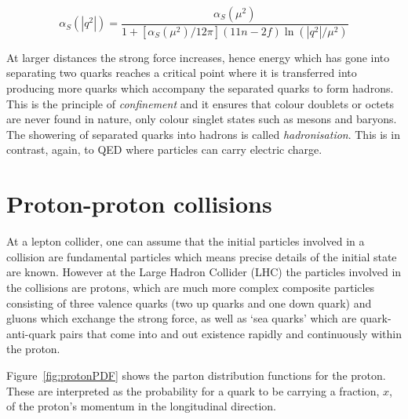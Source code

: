 \begin{equation}
\label{eqn:alphaSQCD}
\alpha_{S}\left( |q^{2}| \right) = \frac{\alpha_{S}\left( \mu^{2} \right)} {1 + \left[ \alpha_{S}\left( \mu^{2} \right)/12\pi \right]\left( 11n -2f \right) \ln \left(|q^{2}|/\mu^{2}\right)}
\end{equation}

At larger distances the strong force increases, hence energy which has gone into separating two quarks reaches a critical point where it is transferred into producing more quarks which accompany the separated quarks to form hadrons. This is the principle of \emph{confinement} and it ensures that colour doublets or octets are never found in nature, only colour singlet states such as mesons and baryons. The showering of separated quarks into hadrons is called \emph{hadronisation}. This is in contrast, again, to QED where particles can carry electric charge.


\section{Proton-proton collisions}
At a lepton collider, one can assume that the initial particles involved in a collision are fundamental particles which means precise details of the initial state are known. However at the Large Hadron Collider (LHC) the particles involved in the collisions are protons, which are much more complex composite particles consisting of three valence quarks (two up quarks and one down quark) and gluons which exchange the strong force, as well as `sea quarks' which are quark-anti-quark pairs that come into and out existence rapidly and continuously within the proton.

Figure~\ref{fig:protonPDF} shows the parton distribution functions for the proton. These are interpreted as the probability for a quark to be carrying a fraction, $x$, of the proton's momentum in the longitudinal direction.

